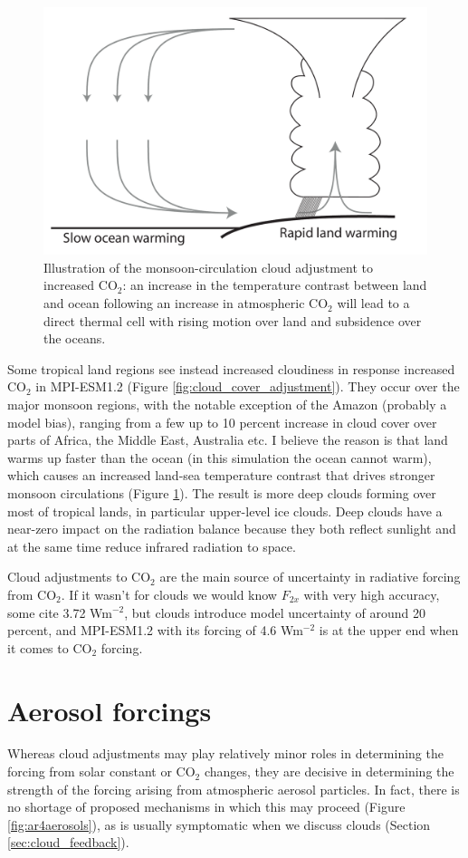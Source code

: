 \documentclass[12pt]{book}
\begin{document}
\begin{figure}
\begin{center}
\includegraphics[width=9 cm]{../illustrations/Land_sea_breeze_CO2_illustration.pdf}
\end{center}
\caption{ Illustration of the monsoon-circulation cloud adjustment to increased CO$_2$: an increase in the temperature contrast between land and ocean following an increase in atmospheric CO$_2$ will lead to a direct thermal cell with rising motion over land and subsidence over the oceans. } 
\label{fig:landseabreeze}
\end{figure}

Some tropical land regions see instead increased cloudiness in response increased CO$_2$ in MPI-ESM1.2 (Figure \ref{fig:cloud_cover_adjustment}). They occur over the major monsoon regions, with the notable exception of the Amazon (probably a model bias), ranging from a few up to 10 percent increase in cloud cover over parts of Africa, the Middle East, Australia etc. I believe the reason is that land warms up faster than the ocean (in this simulation the ocean cannot warm), which causes an increased land-sea temperature contrast that drives stronger monsoon circulations (Figure \ref{fig:landseabreeze}). The result is more deep clouds forming over most of tropical lands, in particular upper-level ice clouds. Deep clouds have a near-zero impact on the radiation balance because they both reflect sunlight and at the same time reduce infrared radiation to space.

Cloud adjustments to CO$_2$ are the main source of uncertainty in radiative forcing from CO$_2$. If it wasn't for clouds we would know $F_{2x}$ with very high accuracy, some cite 3.72 Wm$^{-2}$, but clouds introduce model uncertainty of around 20 percent, and MPI-ESM1.2 with its forcing of 4.6 Wm$^{-2}$ is at the upper end when it comes to CO$_2$ forcing.


\section{Aerosol forcings}
Whereas cloud adjustments may play relatively minor roles in determining the forcing from solar constant or CO$_2$ changes, they are decisive in determining the strength of the forcing arising from atmospheric aerosol particles. In fact, there is no shortage of proposed mechanisms in which this may proceed (Figure \ref{fig:ar4aerosols}), as is usually symptomatic when we discuss clouds (Section \ref{sec:cloud_feedback}). 
\end{document}
